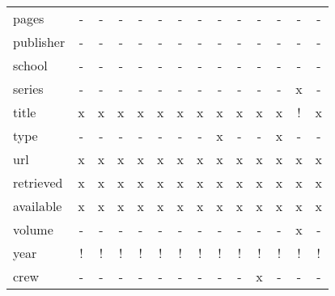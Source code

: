 \begin{sidewaystable}
\begin{tabular}{l c c c c c c c c c c c c c}
pages         & - & - & - & - & - & - & - & - & - & - & - & - & - \\
publisher     & - & - & - & - & - & - & - & - & - & - & - & - & - \\
school        & - & - & - & - & - & - & - & - & - & - & - & - & - \\
series        & - & - & - & - & - & - & - & - & - & - & - & x & - \\
title         & x & x & x & x & x & x & x & x & x & x & x & ! & x \\
type          & - & - & - & - & - & - & - & x & - & - & x & - & - \\
url           & x & x & x & x & x & x & x & x & x & x & x & x & x \\
retrieved     & x & x & x & x & x & x & x & x & x & x & x & x & x \\
available     & x & x & x & x & x & x & x & x & x & x & x & x & x \\
volume        & - & - & - & - & - & - & - & - & - & - & - & x & - \\
year          & ! & ! & ! & ! & ! & ! & ! & ! & ! & ! & ! & ! & ! \\
crew          & - & - & - & - & - & - & - & - & - & x & - & - & -
\end{tabular}
\end{sidewaystable}
